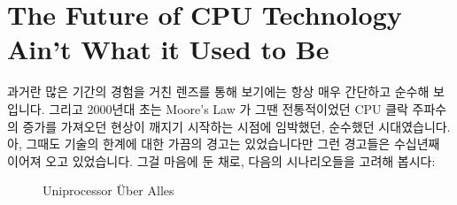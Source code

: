 
\section{The Future of CPU Technology Ain't What it Used to Be}
\label{sec:future:The Future of CPU Technology Ain't What it Used to Be}

과거란 많은 기간의 경험을 거친 렌즈를 통해 보기에는 항상 매우 간단하고 순수해
보입니다.
그리고 2000년대 초는 Moore's Law 가 그땐 전통적이었던 CPU 클락 주파수의 증가를
가져오던 현상이 깨지기 시작하는 시점에 임박했던, 순수했던 시대였습니다.
아, 그때도 기술의 한계에 대한 가끔의 경고는 있었습니다만 그런 경고들은 수십년째
이어져 오고 있었습니다.
그걸 마음에 둔 채로, 다음의 시나리오들을 고려해 봅시다:

\begin{figure}[tb]
\centering
{}
\caption{Uniprocessor \"Uber Alles}
\end{figure}

